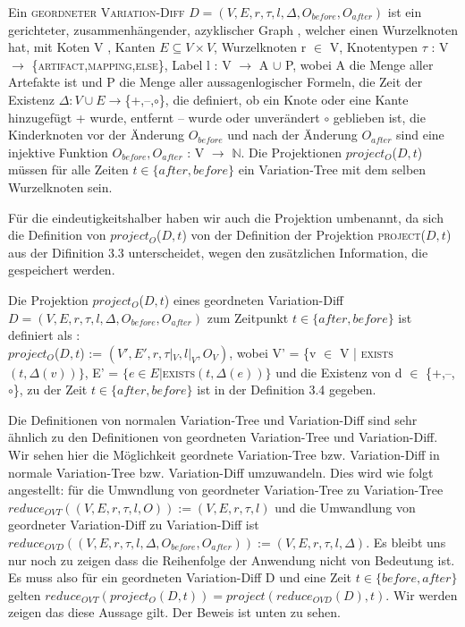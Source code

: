 \begin{definition}
	Ein \textsc{geordneter Variation-Diff} $D=(V,E,r,\tau,l,\Delta,O_{before},O_{after}) $ ist ein gerichteter, zusammenhängender, azyklischer Graph , welcher einen Wurzelknoten hat, mit Koten V , Kanten $E \subseteq V \times V$, Wurzelknoten r $\in$ V, Knotentypen $\tau$ : V $\rightarrow$ \{\textsc{artifact,mapping,else}\}, Label l : V $\rightarrow$ A $\cup$ P, wobei A die Menge aller Artefakte ist und P die Menge aller aussagenlogischer Formeln, die Zeit der Existenz $\Delta : V \cup E \rightarrow $\{+,--,$\circ$\}, die definiert, ob ein Knote oder eine Kante hinzugefügt + wurde, entfernt -- wurde oder unverändert $\circ$ geblieben ist, die Kinderknoten vor der Änderung $O_{before}$ und nach der Änderung $O_{after}$ sind eine injektive Funktion $O_{before},O_{after}$ : V $\rightarrow$ $\mathbb{N}$. Die Projektionen  \textsc{$project_{O}$}($D,t$) müssen für alle Zeiten  $t \in \{after,before\}$ ein Variation-Tree mit dem selben Wurzelknoten sein.
	
\end{definition}

Für die eindeutigkeitshalber haben wir auch die Projektion umbenannt, da sich die Definition von \textsc{$project_{O}$}($D,t$) von der Definition der Projektion \textsc{project}($D,t$) aus der Difinition 3.3 unterscheidet, wegen den zusätzlichen Information, die gespeichert werden. 

\begin{definition}
	Die Projektion \textsc{$project_O$}($D,t$) eines geordneten Variation-Diff \\$D=(V,E,r,\tau,l,\Delta,O_{before},O_{after}) $ zum Zeitpunkt $t \in \{after,before\}$ ist definiert als :\\ \textsc{$project_O$}($D,t$) := $(V',E',r,\tau|_V,l|_V,O_V)$, wobei V' = \{v $\in$ V | \textsc{exists}$(t,\Delta(v))\}$, E' = $\{e \in E | $\textsc{exists}$(t,\Delta(e))\}$ und die Existenz von d $\in$ \{+,--,$\circ$\}, zu der Zeit $t \in \{after,before\}$ ist in der Definition 3.4 gegeben.
\end{definition}

Die Definitionen von normalen Variation-Tree und Variation-Diff sind sehr ähnlich zu den Definitionen von geordneten Variation-Tree und Variation-Diff. Wir sehen hier die Möglichkeit geordnete Variation-Tree bzw. Variation-Diff in normale Variation-Tree bzw. Variation-Diff umzuwandeln. Dies wird wie folgt angestellt: für die Umwndlung von geordneter Variation-Tree zu Variation-Tree $reduce_{OVT}((V,E,r,\tau,l,O)) := (V,E,r,\tau,l)$ und die Umwandlung von geordneter Variation-Diff zu Variation-Diff ist $reduce_{OVD}((V,E,r,\tau,l,\Delta,O_{before},O_{after})) := (V,E,r,\tau,l,\Delta)$. Es bleibt uns nur noch zu zeigen dass die Reihenfolge der Anwendung nicht von Bedeutung ist. Es muss also für ein geordneten Variation-Diff D und eine Zeit $t \in \{before, after\}$ gelten $reduce_{OVT}(project_O(D,t)) = project(reduce_{OVD}(D),t)$. Wir werden zeigen das diese Aussage gilt. Der Beweis ist unten zu sehen.

